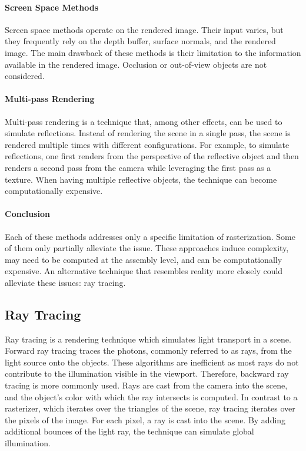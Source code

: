 \paragraph{Screen Space Methods}

Screen space methods operate on the rendered image. Their input varies, but they frequently rely on the depth buffer, surface normals, and the rendered image. The main drawback of these methods is their limitation to the information available in the rendered image. Occlusion or out-of-view objects are not considered.

\paragraph{Multi-pass Rendering}

Multi-pass rendering is a technique that, among other effects, can be used to simulate reflections. Instead of rendering the scene in a single pass, the scene is rendered multiple times with different configurations. For example, to simulate reflections, one first renders from the perspective of the reflective object and then renders a second pass from the camera while leveraging the first pass as a texture. When having multiple reflective objects, the technique can become computationally expensive.

\paragraph{Conclusion}

Each of these methods addresses only a specific limitation of rasterization. Some of them only partially alleviate the issue. These approaches induce complexity, may need to be computed at the assembly level, and can be computationally expensive. An alternative technique that resembles reality more closely could alleviate these issues: ray tracing.

\subsection{Ray Tracing}
\label{ch:rayTracingTheory}

Ray tracing is a rendering technique which simulates light transport in a scene. Forward ray tracing traces the photons, commonly referred to as rays, from the light source onto the objects. These algorithms are inefficient as most rays do not contribute to the illumination visible in the viewport. Therefore, backward ray tracing is more commonly used. Rays are cast from the camera into the scene, and the object's color with which the ray intersects is computed. In contrast to a rasterizer, which iterates over the triangles of the scene, ray tracing iterates over the pixels of the image. For each pixel, a ray is cast into the scene. By adding additional bounces of the light ray, the technique can simulate global illumination.


